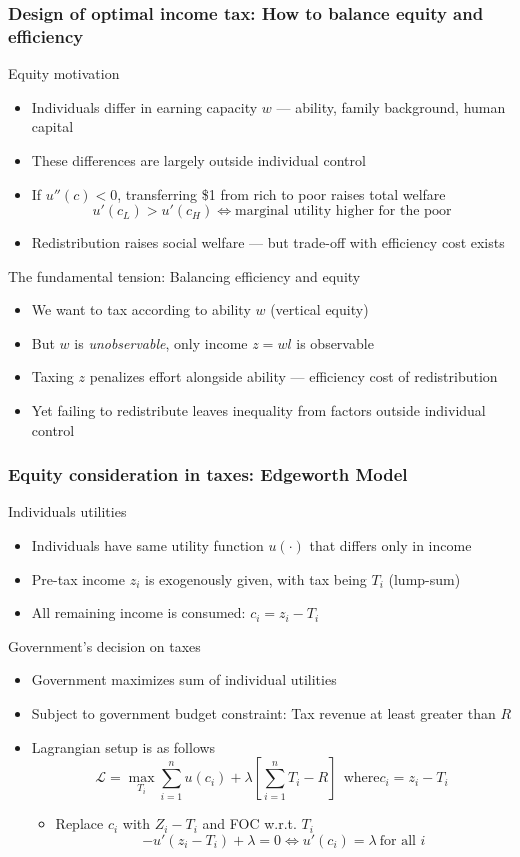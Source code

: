 \documentclass[aspectratio=169]{beamer}
\begin{document}
\begin{frame}
\frametitle{Design of optimal income tax: How to balance equity and efficiency}

Equity motivation
\begin{itemize}\setlength\itemsep{3pt}
    \item Individuals differ in earning capacity $w$ --- ability, family background, human capital
    \item These differences are largely outside individual control
    \item If $u''(c) < 0$, transferring \$1 from rich to poor raises total welfare
    \[
        u'(c_L) > u'(c_H) \iff \text{marginal utility higher for the poor}
    \]
\item Redistribution raises social welfare --- but trade-off with efficiency cost exists
\end{itemize}\medskip
The fundamental tension: Balancing efficiency and equity
\begin{itemize}\setlength\itemsep{3pt}
    \item We want to tax according to ability $w$ (vertical equity) 
    \item But $w$ is \textit{unobservable}, only income $z = wl$ is observable
    \item Taxing $z$ penalizes effort alongside ability --- efficiency cost of redistribution
    \item Yet failing to redistribute leaves inequality from factors outside individual control
\end{itemize}
\end{frame}

\begin{frame}
\frametitle{Equity consideration in taxes: Edgeworth Model}
Individuals utilities
\begin{itemize}\setlength\itemsep{3pt}
\item Individuals have same utility function $u(\cdot)$ that differs only in income
\item Pre-tax income $z_i$ is exogenously given, with tax being $T_i$ (lump-sum)
\item All remaining income is consumed: $c_i=z_i-T_i$
\end{itemize} \medskip
Government's decision on taxes
\begin{itemize}\setlength\itemsep{3pt}
\item Government maximizes sum of individual utilities
\item Subject to government budget constraint: Tax revenue at least greater than $R$
\item Lagrangian setup is as follows
\[
\mathcal{L}=\max_{T_i}\sum_{i=1}^n u(c_i)+\lambda\left[\sum_{i=1}^n T_i-R\right] \ \ \text{where} c_i = z_i-T_i
\]\vspace{-10pt}
\begin{itemize}
\item Replace $c_i$ with $Z_i-T_i$ and FOC w.r.t. $T_i$
\[
-u'(z_i-T_i)+\lambda=0 \iff u'(c_i)=\lambda \ \text{for all } i
\]
\end{itemize}
\end{itemize} \medskip
\end{frame}
\end{document}
